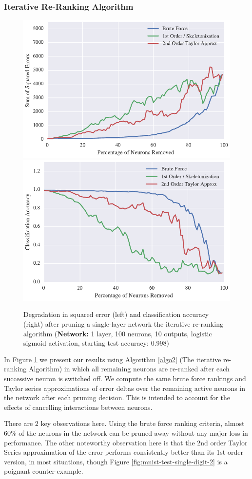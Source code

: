 \subsubsection{Iterative Re-Ranking Algorithm}
\begin{figure}[!ht]
\centering
\includegraphics[width=0.49\linewidth]{png/mnist-acc99-iterative-rerank-method.pdf}
\includegraphics[width=0.49\linewidth]{png/mnist-acc99-iterative-rerank-accuracy.pdf}
\caption{Degradation in squared error (left) and classification accuracy (right) after pruning a single-layer network the iterative re-ranking algorithm (\textbf{Network:} 1 layer, 100 neurons, 10 outputs, logistic sigmoid activation, starting test accuracy: 0.998)}
\label{fig:mnist-re-ranking-single-layer}
\end{figure}

In Figure \ref{fig:mnist-re-ranking-single-layer} we present our results using Algorithm \ref{algo2} (The iterative re-ranking Algorithm) in which all remaining neurons are re-ranked after each successive neuron is switched off. We compute the same brute force rankings and Taylor series approximations of error deltas over the remaining active neurons in the network after each pruning decision. This is intended to account for the effects of cancelling interactions between neurons. 

There are 2 key observations here. Using the brute force ranking criteria, almost 60\% of the neurons in the network can be pruned away without any major loss in performance. The other noteworthy observation here is that the 2nd order Taylor Series approximation of the error performs consistently better than its 1st order version, in most situations, though Figure \ref{fig:mnist-test-single-digit-2} is a poignant counter-example. 

